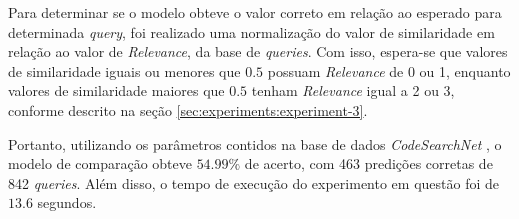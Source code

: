 Para determinar se o modelo obteve o valor correto em relação ao esperado para determinada \textit{query}, foi realizado uma normalização do valor de similaridade em relação ao valor de \textit{Relevance}, da base de \textit{queries}. Com isso, espera-se que valores de similaridade iguais ou menores que $0.5$ possuam \textit{Relevance} de 0 ou 1, enquanto valores de similaridade maiores que $0.5$ tenham \textit{Relevance} igual a 2 ou 3, conforme descrito na seção \ref{sec:experiments:experiment-3}.

Portanto, utilizando os parâmetros contidos na base de dados \textit{CodeSearchNet} \cite{Husain2019CodeSearchNetCE}, o modelo de comparação obteve $54.99\%$ de acerto, com 463 predições corretas de 842 \textit{queries}. Além disso, o tempo de execução do experimento em questão foi de $13.6$ segundos.
